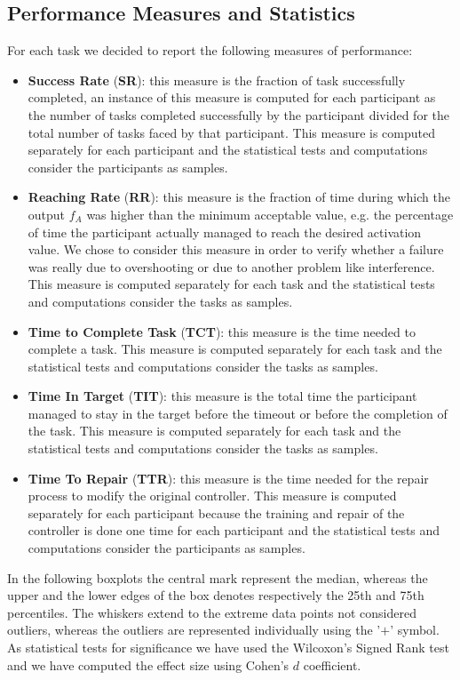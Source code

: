 \subsection{Performance Measures and Statistics}\label{subsec:measures}
For each task we decided to report the following measures of performance:
\begin{itemize}
    \item \textbf{Success Rate} (\textbf{SR}): this measure is the fraction of task successfully completed, an instance of this measure is computed for each participant as the number of tasks completed successfully by the participant divided for the total number of tasks faced by that participant. This measure is computed separately for each participant and the statistical tests and computations consider the participants as samples.
    \item \textbf{Reaching Rate} (\textbf{RR}): this measure is the fraction of time during which the output $f_A$ was higher than the minimum acceptable value, e.g. the percentage of time the participant actually managed to reach the desired activation value.
    We chose to consider this measure in order to verify whether a failure was really due to overshooting or due to another problem like interference.
    This measure is computed separately for each task and the statistical tests and computations consider the tasks as samples.
    \item \textbf{Time to Complete Task} (\textbf{TCT}): this measure is the time needed to complete a task. This measure is computed separately for each task and the statistical tests and computations consider the tasks as samples.
    \item \textbf{Time In Target} (\textbf{TIT}): this measure is the total time the participant managed to stay in the target before the timeout or before the completion of the task. This measure is computed separately for each task and the statistical tests and computations consider the tasks as samples.
    \item \textbf{Time To Repair} (\textbf{TTR}): this measure is the time needed for the repair process to modify the original controller. This measure is computed separately for each participant because the training and repair of the controller is done one time for each participant and the statistical tests and computations consider the participants as samples.
\end{itemize}
In the following boxplots the central mark represent the median, whereas the upper and the lower edges of the box denotes respectively the 25th and 75th percentiles. The whiskers extend to the extreme data points not considered outliers, whereas the outliers are represented individually using the '$+$' symbol.
As statistical tests for significance we have used the Wilcoxon's Signed Rank test and we have computed the effect size using Cohen's $d$ coefficient.
%
%
%
%
%
